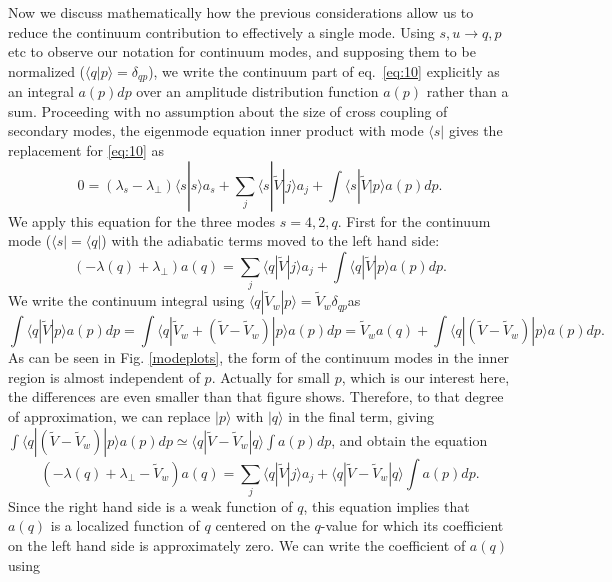 \documentclass[12pt]{article}
\def\ket#1{|#1\rangle}
\def\bra#1{\langle#1}
\begin{document}
Now we discuss mathematically how the previous considerations allow us
to reduce the continuum contribution to effectively a single mode.
Using $s,u\to q,p$ etc to observe our notation for continuum modes,
and supposing them to be normalized ($\bra{q}\ket{p}=\delta_{qp}$), we
write the continuum part of eq.\ \ref{eq:10} explicitly as an integral
$a(p)dp$ over an amplitude distribution function $a(p)$ rather than a
sum.  Proceeding with no assumption about the size of cross coupling
of secondary modes, the eigenmode equation inner product with mode
$\bra{s}|$ gives the replacement for \ref{eq:10} as
\begin{equation}
  \label{eigengen}
  0=(\lambda_s-\lambda_\perp)\bra{s}\ket{s}a_s+\sum_j\bra{s}|\tilde{V}\ket{j}a_j
+\int\bra{s}|\tilde{V}\ket{p}a(p)dp.
\end{equation}
We apply this equation for the three modes $s=4,2,q$. First for the
continuum mode ($\bra{s}|=\bra{q}|$) with the adiabatic terms moved to
the left hand side:
\begin{equation}
  \label{eigqfirst}
  (-\lambda(q)+\lambda_\perp)a(q)=\sum_j\bra{q}|\tilde{V}\ket{j}a_j
+\int\bra{q}|\tilde V\ket{p} a(p)dp.
\end{equation}
We write the continuum integral using $\bra{q}|\tilde V_w\ket{p}=
\tilde V_w \delta_{qp}$as 
\begin{equation}
  \label{eq:18}
  \int \bra{q}|\tilde{V}\ket{p}a(p)dp=\int\bra{q}|\tilde{V}_{w}+(\tilde{V}-\tilde{V}_{w})\ket{p}a(p)dp
  =\tilde{V}_{w}a(q) +\int\bra{q}|(\tilde{V}-\tilde{V}_{w})\ket{p}a(p)dp.
\end{equation}
As can be seen in Fig. \ref{modeplots}, the form of the continuum
modes in the inner region is almost independent of $p$. Actually for
small $p$, which is our interest here, the differences are even
smaller than that figure shows. Therefore, to that degree of
approximation, we can replace $\ket{p}$ with $\ket{q}$ in the final
term, giving $\int\bra{q}|(\tilde{V}-\tilde{V}_{w})\ket{p}a(p)dp\simeq
\bra{q}|\tilde{V}-\tilde{V}_{w}\ket{q}\int a(p)dp$, and obtain the
equation
\begin{equation}
  \label{eigq}
  (-\lambda(q)+\lambda_\perp-\tilde V_w)a(q)=\sum_j\bra{q}|\tilde{V}\ket{j}a_j
+\bra{q}|\tilde V-\tilde V_w\ket{q}\int a(p)dp.
\end{equation}
Since the right hand side is a weak function of $q$, this equation
implies that $a(q)$ is a localized function of $q$ centered on the
$q$-value for which its coefficient on the left hand side is
approximately zero. We can write the coefficient of $a(q)$ using
\end{document}
